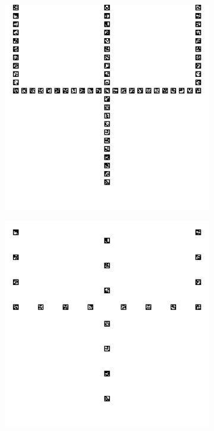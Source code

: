 \documentclass[../Head/report.tex]{subfiles}
\begin{document}
\begin{figure}[H]
\begin{subfigure}[t]{.20\textwidth}
        \includegraphics[width=\textwidth]{../Figures/vision_navigation/grid_board_new_200_big_onepattern.png}
        \caption{}
        \label{fig:vision_navigation_one_pattern_board}
    \end{subfigure}
     \hspace{0.2em}
    \begin{subfigure}[t]{.20\textwidth}
        \centering
        \includegraphics[width=\textwidth]{../Figures/vision_navigation/grid_board_new_200_big_onepattern_missing_markers1.png}

\end{subfigure}
\end{figure}
\end{document}
